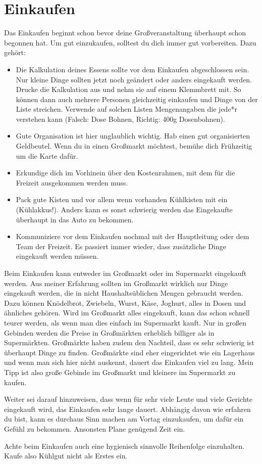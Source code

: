 \section{Einkaufen}\label{sec:einkaufen}
Das Einkaufen beginnt schon bevor deine Großveranstaltung überhaupt schon begonnen hat.
Um gut einzukaufen, solltest du dich immer gut vorbereiten.
Dazu gehört:
\begin{itemize}
    \item Die Kalkulation deines Essens sollte vor dem Einkaufen abgeschlossen sein.
    Nur kleine Dinge sollten jetzt noch geändert oder anders eingekauft werden.
    Drucke die Kalkulation aus und nehm sie auf einem Klemmbrett mit.
    So können dann auch mehrere Personen gleichzeitig einkaufen und Dinge von der Liste streichen.
    Verwende auf solchen Listen Mengenangaben die jede*r verstehen kann (Falsch:  Dose Bohnen\grqq , Richtig: \qlqq 400g Dosenbohnen\grqq).
    \item Gute Organisation ist hier unglaublich wichtig.
    Hab einen gut organisierten Geldbeutel.
    Wenn du in einen Großmarkt möchtest, bemühe dich Frühzeitig um die Karte dafür.
    \item Erkundige dich im Vorhinein über den Kostenrahmen, mit dem für die Freizeit ausgekommen werden muss.
    \item Pack gute Kisten und vor allem wenn vorhanden Kühlkisten mit ein (Kühlakkus!).
    Anders kann es sonst schwierig werden das Eingekaufte überhaupt in das Auto zu bekommen.
    \item Kommuniziere vor dem Einkaufen nochmal mit der Hauptleitung oder dem Team der Freizeit.
    Es passiert immer wieder, dass zusätzliche Dinge eingekauft werden müssen.
\end{itemize}
Beim Einkaufen kann entweder im Großmarkt oder im Supermarkt eingekauft werden.
Aus meiner Erfahrung sollten im Großmarkt wirklich nur Dinge eingekauft werden, die in nicht Haushaltsüblichen Mengen gebraucht werden.
Dazu können Knödelbrot, Zwiebeln, Wurst, Käse, Joghurt, alles in Dosen und ähnliches gehören.
Wird im Großmarkt alles eingekauft, kann das schon schnell teurer werden, als wenn man dies einfach im Supermarkt kauft.
Nur in großen Gebinden werden die Preise in Großmärkten erheblich billiger als in Supermärkten.
Großmärkte haben zudem den Nachteil, dass es sehr schwierig ist überhaupt Dinge zu finden.
Großmärkte sind eher eingerichtet wie ein Lagerhaus und wenn man sich hier nicht auskennt, dauert das Einkaufen viel zu lang.
Mein Tipp ist also große Gebinde im Großmarkt und kleinere im Supermarkt zu kaufen.

Weiter sei darauf hinzuweisen, dass wenn für sehr viele Leute und viele Gerichte eingekauft wird, das Einkaufen sehr lange dauert.
Abhängig davon wie erfahren du bist, kann es durchaus Sinn machen am Vortag einzukaufen, um dafür ein Gefühl zu bekommen.
Ansonsten Plane genügend Zeit ein.

Achte beim Einkaufen auch eine hygienisch sinnvolle Reihenfolge einzuhalten.
Kaufe also Kühlgut nicht als Erstes ein.

